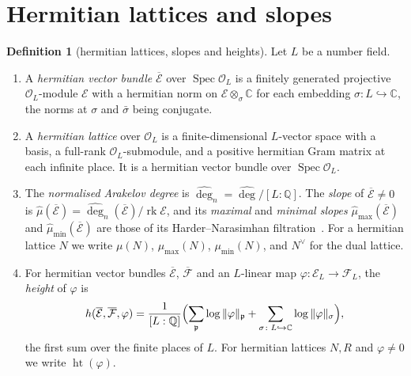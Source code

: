 \documentclass[11pt]{amsbook}
\theoremstyle{plain}
\theoremstyle{definition}
\newtheorem{definition}[theorem]{Definition}
\theoremstyle{remark}
\numberwithin{equation}{section}
\numberwithin{figure}{chapter}
\numberwithin{table}{chapter}
\newcommand{\Q}{\mathbb{Q}}
\renewcommand{\C}{\mathbb{C}}
\newcommand{\rk}{\operatorname{rk}}
\begin{document}
\section{Hermitian lattices and slopes}

\begin{definition}[hermitian lattices, slopes and heights]
\label{def:hlat}
Let $L$ be a number field.
\begin{enumerate}[label=(\arabic*)]
\item A \emph{hermitian vector bundle} $\overline{\mathcal E}$ over
$\operatorname{Spec}\mathcal O_L$ is a finitely generated projective
$\mathcal O_L$-module $\mathcal E$ with a hermitian norm on
$\mathcal E\otimes_\sigma\C$ for each embedding $\sigma\colon
L\hookrightarrow\C$, the norms at $\sigma$ and $\bar\sigma$ being
conjugate.
\item A \emph{hermitian lattice} over $\mathcal O_L$ is a
finite-dimensional $L$-vector space with a basis, a full-rank
$\mathcal O_L$-submodule, and a positive hermitian Gram matrix at each
infinite place. It is a hermitian vector bundle over
$\operatorname{Spec}\mathcal O_L$.
\item The \emph{normalised Arakelov degree} is
$\widehat{\deg}_n=\widehat{\deg}/[L:\Q]$. The \emph{slope} of
$\overline{\mathcal E}\ne0$ is $\hat\mu(\overline{\mathcal E})=
\widehat{\deg}_n(\overline{\mathcal E})/\rk\mathcal E$, and its
\emph{maximal} and \emph{minimal slopes}
$\hat\mu_{\max}(\overline{\mathcal E})$ and
$\hat\mu_{\min}(\overline{\mathcal E})$ are those of its
Harder--Narasimhan filtration~\cite{Stuhler1976,Grayson1984}. For a
hermitian lattice $N$ we write $\mu(N)$, $\mu_{\max}(N)$,
$\mu_{\min}(N)$, and $N^\vee$ for the dual lattice.
\item\label{item:hl-height}
For hermitian vector bundles $\overline{\mathcal E}$,
$\overline{\mathcal F}$ and an $L$-linear map $\varphi\colon\mathcal
E_L\to\mathcal F_L$, the \emph{height} of $\varphi$ is
\[
h(\overline{\mathcal E},\overline{\mathcal F},\varphi)=\frac1{[L:\Q]}
\Bigl(\sum_{\mathfrak p}\log\|\varphi\|_{\mathfrak p}
+\sum_{\sigma\colon L\hookrightarrow\C}\log\|\varphi\|_\sigma\Bigr),
\]
the first sum over the finite places of $L$. For hermitian lattices
$N,R$ and $\varphi\ne0$ we write $\operatorname{ht}(\varphi)$.
\end{enumerate}
\end{definition}
\end{document}
